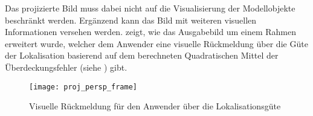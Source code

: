 Das projizierte Bild muss dabei nicht auf die Visualisierung der Modellobjekte beschränkt werden. Ergänzend kann das Bild mit weiteren visuellen Informationen versehen werden.  zeigt, wie das Ausgabebild um einem Rahmen erweitert wurde, welcher dem Anwender eine visuelle Rückmeldung über die Güte der Lokalisation basierend auf dem berechneten Quadratischen Mittel der Überdeckungsfehler (siehe ) gibt.\\

\prever{
}

\begin{figure}[!ht]
	\begin{center}
		\texttt{[image: proj\_persp\_frame]}
		\caption{Visuelle Rückmeldung für den Anwender über die Lokalisationsgüte}
		\label{fig.proj_rms}
	\end{center}
\end{figure}

